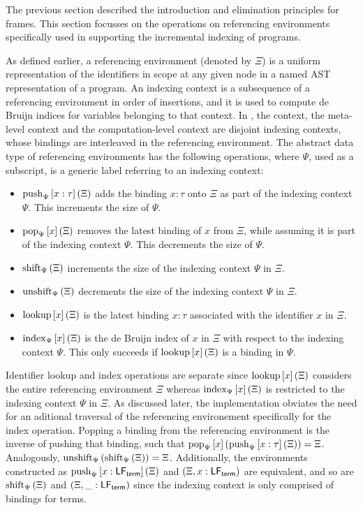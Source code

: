 The previous section described the introduction and elimination principles for frames.
This section focusses on the operations on referencing environments specifically used in supporting the incremental indexing of \Beluga programs.

As defined earlier, a referencing environment (denoted by $\Xi$) is a uniform representation of the identifiers in scope at any given node in a named \ac{AST} representation of a program.
An indexing context is a subsequence of a referencing environment in order of insertions, and it is used to compute de Bruijn indices for variables belonging to that context.
In \Beluga, the \LF context, the meta-level context and the computation-level context are disjoint indexing contexts, whose bindings are interleaved in the referencing environment.
The abstract data type of referencing environments has the following operations, where $\Psi$, used as a subscript, is a generic label referring to an indexing context:
\begin{itemize}
\item
$\operatorname{push}_{\Psi}\left[x : \tau\right]\left(\Xi\right)$ adds the binding $x : \tau$ onto $\Xi$ as part of the indexing context $\Psi$.
This increments the size of $\Psi$.
\item
$\operatorname{pop}_{\Psi}\left[x\right]\left(\Xi\right)$ removes the latest binding of $x$ from $\Xi$, while assuming it is part of the indexing context $\Psi$.
This decrements the size of $\Psi$.
\item
$\operatorname{shift}_{\Psi}\left(\Xi\right)$ increments the size of the indexing context $\Psi$ in $\Xi$.
\item
$\operatorname{unshift}_{\Psi}\left(\Xi\right)$ decrements the size of the indexing context $\Psi$ in $\Xi$.
\item
$\operatorname{lookup}\left[x\right]\left(\Xi\right)$ is the latest binding $x : \tau$ associated with the identifier $x$ in $\Xi$.
\item
$\operatorname{index}_{\Psi}\left[x\right]\left(\Xi\right)$ is the de Bruijn index of $x$ in $\Xi$ with respect to the indexing context $\Psi$.
This only succeeds if $\operatorname{lookup}\left[x\right]\left(\Xi\right)$ is a binding in $\Psi$.
\end{itemize}

Identifier lookup and index operations are separate since $\operatorname{lookup}\left[x\right]\left(\Xi\right)$ considers the entire referencing environment $\Xi$ whereas $\operatorname{index}_{\Psi}\left[x\right]\left(\Xi\right)$ is restricted to the indexing context $\Psi$ in $\Xi$.
As discussed later, the implementation obviates the need for an aditional traversal of the referencing environement specifically for the index operation.
Popping a binding from the referencing environment is the inverse of pushing that binding, such that $\operatorname{pop}_{\Psi}\left[x\right]\left(\operatorname{push}_{\Psi}\left[x : \tau\right]\left(\Xi\right)\right) = \Xi$.
Analogously, $\operatorname{unshift}_{\Psi}\left(\operatorname{shift}_{\Psi}\left(\Xi\right)\right) = \Xi$.
Additionally, the environments constructed as $\operatorname{push}_{\Psi}\left[x : \mathsf{LF}_{\mathsf{term}}\right]\left(\Xi\right) $ and $ (\Xi, x : \mathsf{LF}_{\mathsf{term}})$ are equivalent, and so are $\operatorname{shift}_{\Psi}\left(\Xi\right) $ and $ (\Xi, \_ : \mathsf{LF}_{\mathsf{term}})$ since the \LF indexing context is only comprised of bindings for \LF terms.

